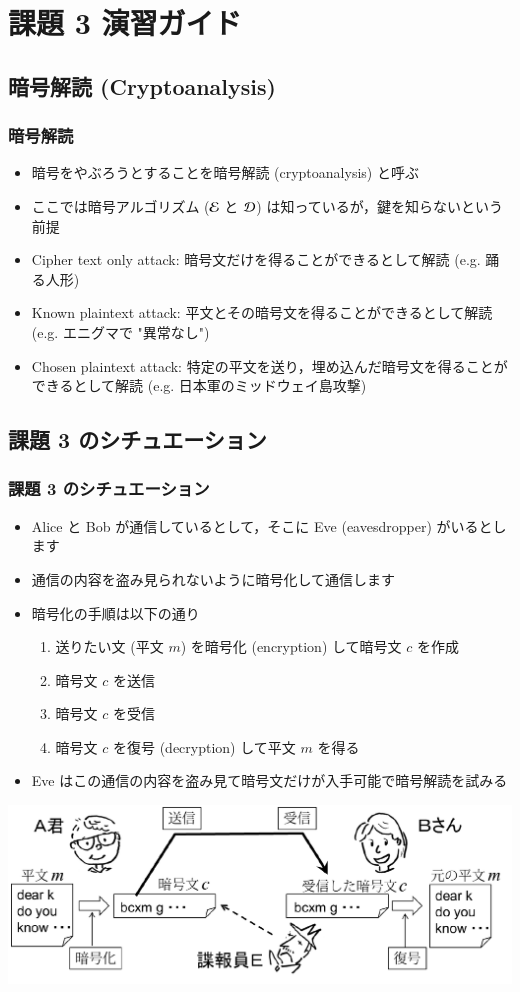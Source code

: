 \section{課題 3 演習ガイド}
%
%
\subsection{暗号解読 (Cryptoanalysis)}
\begin{frame}
\frametitle{暗号解読}
  \begin{itemize}
\item 暗号をやぶろうとすることを暗号解読 (cryptoanalysis) と呼ぶ
\item ここでは暗号アルゴリズム (\(\cal E\) と \(\cal D\)) は知っているが，鍵を知らないという前提
\item Cipher text only attack: 暗号文だけを得ることができるとして解読 (e.g. 踊る人形)
\item Known plaintext attack: 平文とその暗号文を得ることができるとして解読 (e.g. エニグマで "異常なし")
\item Chosen plaintext attack: 特定の平文を送り，埋め込んだ暗号文を得ることができるとして解読 (e.g. 日本軍のミッドウェイ島攻撃)
  \end{itemize}
\end{frame}
\subsection{課題 3 のシチュエーション}
\begin{frame}[containsverbatim,label=situation,shrink]
\frametitle{課題 3 のシチュエーション}
  \begin{itemize}
\item Alice と Bob が通信しているとして，そこに Eve (eavesdropper) がいるとします
\item 通信の内容を盗み見られないように暗号化して通信します
\item 暗号化の手順は以下の通り
    \begin{enumerate}
\item 送りたい文 (平文 $m$) を暗号化 (encryption) して暗号文 $c$ を作成
\item 暗号文 $c$ を送信
\item 暗号文 $c$ を受信
\item 暗号文 $c$ を復号 (decryption) して平文 $m$ を得る
    \end{enumerate}
\item Eve はこの通信の内容を盗み見て暗号文だけが入手可能で暗号解読を試みる
  \end{itemize}
  \begin{center}
\includegraphics[scale=0.3]{./Figure/elementaryCS-figAliceBob.pdf}
  \end{center}
\end{frame}
